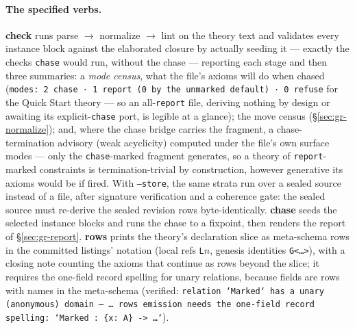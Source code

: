 \paragraph{The specified verbs.}
\textbf{check} runs parse $\to$ normalize $\to$ lint on the theory
text and validates every instance block against the elaborated
closure by actually seeding it — exactly the checks \texttt{chase}
would run, without the chase — reporting each stage and then three
summaries: a \emph{mode census}, what the file's axioms will do when
chased (\texttt{modes: 2 chase · 1 report (0 by the unmarked default)
· 0 refuse} for the Quick Start theory — so an all-\texttt{report}
file, deriving nothing by design or awaiting its
explicit-\texttt{chase} port, is legible at a glance); the move
census (\S\ref{sec:gr-normalize}); and, where the chase bridge
carries the fragment, a chase-termination advisory (weak acyclicity)
computed under the file's own surface modes — only the
\texttt{chase}-marked fragment generates, so a theory of
\texttt{report}-marked constraints is termination-trivial by
construction, however generative its axioms would be if fired. With
\texttt{--store}, the same strata run over a sealed source instead
of a file, after signature verification and a coherence gate: the
sealed source must re-derive the sealed revision rows
byte-identically.
\textbf{chase} seeds the selected instance blocks and runs the chase
to a fixpoint, then renders the report of \S\ref{sec:gr-report}.
\textbf{rows} prints the theory's declaration slice as meta-schema
rows in the committed listings' notation (local refs \texttt{L$n$},
genesis identities \texttt{G<…>}), with a closing note counting the
axioms that continue as rows beyond the slice; it requires the
one-field record spelling for unary relations, because fields are
rows with names in the meta-schema (verified: \texttt{relation
`Marked` has a unary (anonymous) domain — … rows emission needs the
one-field record spelling: `Marked : \{x: A\} -> …`}).

